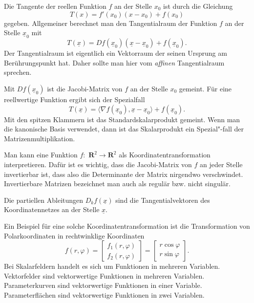 \documentclass[a4paper,11pt,fleqn,twocolumn,twoside]{scrartcl}
\numberwithin{equation}{section}
\begin{document}
Die Tangente der reellen Funktion $f$ an der Stelle $x_0$
ist durch die Gleichung
\begin{equation}
T(x) = f'(x_0)(x-x_0)+f(x_0)
\end{equation}
%
gegeben. Allgemeiner berechnet man den Tangentialraum der Funktion $f$
an der Stelle $\underline x_0$ mit
\begin{equation}
T(\underline x)
= Df(\underline x_0)(\underline x-\underline x_0)+f(\underline x_0).
\end{equation}
%
Der Tangentialraum ist eigentlich ein Vektorraum der seinen Ursprung
am Berührungspunkt hat. Daher sollte man hier vom \textit{affinen}
Tangentialraum sprechen.

Mit $Df(\underline x_0)$ ist die Jacobi-Matrix von $f$ an der
Stelle $x_0$ gemeint. Für eine reellwertige Funktion ergibt sich der
Spezialfall
\begin{equation}
T(\underline x) = \langle\nabla f(\underline x_0),\underline x
-\underline x_0\rangle+f(\underline x_0).
\end{equation}
%
Mit den spitzen Klammern ist das Standardskalarprodukt gemeint.
Wenn man die kanonische Basis verwendet, dann ist das Skalarprodukt
ein Spezial"-fall der Matrizenmultiplikation.

Man kann eine Funktion $f{:}\,\, \mathbf R^2\rightarrow \mathbf R^2$
als Koordinatentransformation interpretieren. Dafür ist es wichtig,
dass die Jacobi-Matrix von $f$ an jeder Stelle invertierbar ist,
dass also die Determinante der Matrix nirgendwo verschwindet.
Invertierbare Matrizen bezeichnet man auch als regulär bzw.
nicht singulär.

Die partiellen Ableitungen $D_kf(\underline x)$ sind die
Tangentialvektoren des Koordinatennetzes an der Stelle
$\underline x$.

Ein Beispiel für eine solche Koordinatentransformation ist die
Transformation von Polarkoordinaten in rechtwinklige Koordinaten
\begin{equation}
f(r,\varphi)
= \begin{bmatrix}
f_1(r,\varphi)\\
f_2(r,\varphi)
\end{bmatrix}
= \begin{bmatrix}
r\cos\varphi\\
r\sin\varphi
\end{bmatrix}.
\end{equation}
\noindent
Bei Skalarfeldern handelt es sich um Funktionen in mehreren
Variablen. Vektorfelder sind vektorwertige Funktionen in mehreren
Variablen. Parameterkurven sind vektorwertige Funktionen in einer
Variable. Parameterflächen sind vektorwertige Funktionen in zwei
Variablen.
\end{document}
